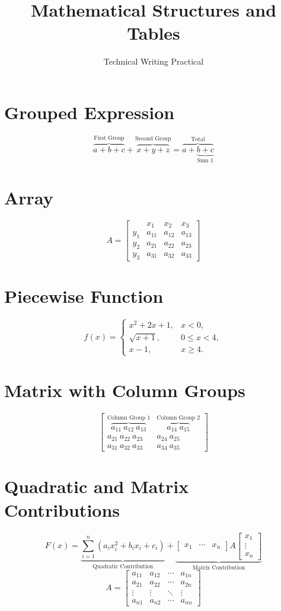 \documentclass[10pt,a4paper]{article}
\title{Mathematical Structures and Tables}
\author{Technical Writing Practical}
\date{}
\begin{document}
\maketitle
\section*{Grouped Expression}
\[
\overbrace{a+b+c}^{\text{First Group}}+
\overbrace{x+y+z}^{\text{Second Group}}
=\overbrace{a+\underbrace{b+c}_{\text{Sum 1}}}^{\text{Total}}
\]
\section*{Array}
\[
A=\left[\begin{array}{c|ccc}
&x_1&x_2&x_3\\\hline
y_1&a_{11}&a_{12}&a_{13}\\
y_2&a_{21}&a_{22}&a_{23}\\
y_3&a_{31}&a_{32}&a_{33}
\end{array}\right]
\]
\section*{Piecewise Function}
\[
f(x)=\begin{cases}
x^2+2x+1,&x<0,\\
\sqrt{x+1},&0\leq x<4,\\
x-1,&x\geq4.
\end{cases}
\]
\section*{Matrix with Column Groups}
\[
\begin{bmatrix}
\overbrace{a_{11}\ a_{12}\ a_{13}}^{\text{Column Group 1}}&
\overbrace{a_{14}\ a_{15}}^{\text{Column Group 2}}\\
a_{21}\ a_{22}\ a_{23}&a_{24}\ a_{25}\\
a_{31}\ a_{32}\ a_{33}&a_{34}\ a_{35}
\end{bmatrix}
\]
\section*{Quadratic and Matrix Contributions}
\[
F(x)=\underbrace{\sum_{i=1}^{n}(a_ix_i^2+b_ix_i+c_i)}_{\text{Quadratic Contribution}}
+\underbrace{\begin{bmatrix}x_1&\cdots&x_n\end{bmatrix}
A\begin{bmatrix}x_1\\\vdots\\x_n\end{bmatrix}}_{\text{Matrix Contribution}}
\]
\[
A=\begin{bmatrix}a_{11}&a_{12}&\cdots&a_{1n}\\
a_{21}&a_{22}&\cdots&a_{2n}\\
\vdots&\vdots&\ddots&\vdots\\a_{n1}&a_{n2}&\cdots&a_{nn}\end{bmatrix}
\]
\end{document}
